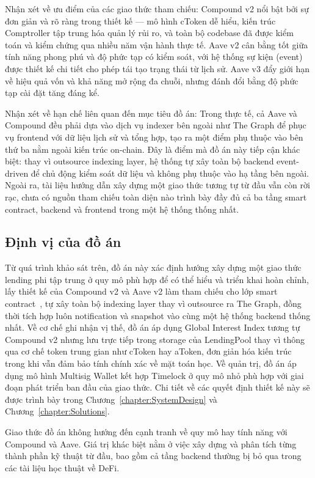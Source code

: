 \documentclass[../DoAn.tex]{subfiles}
\begin{document}
Nhận xét về ưu điểm của các giao thức tham chiếu: Compound v2 nổi bật bởi sự đơn giản và rõ ràng trong thiết kế --- mô hình cToken dễ hiểu, kiến trúc Comptroller tập trung hóa quản lý rủi ro, và toàn bộ codebase đã được kiểm toán và kiểm chứng qua nhiều năm vận hành thực tế. Aave v2 cân bằng tốt giữa tính năng phong phú và độ phức tạp có kiểm soát, với hệ thống sự kiện (event) được thiết kế chi tiết cho phép tái tạo trạng thái từ lịch sử. Aave v3 đẩy giới hạn về hiệu quả vốn và khả năng mở rộng đa chuỗi, nhưng đánh đổi bằng độ phức tạp cài đặt tăng đáng kể.

Nhận xét về hạn chế liên quan đến mục tiêu đồ án: Trong thực tế, cả Aave và Compound đều phải dựa vào dịch vụ indexer bên ngoài như The Graph để phục vụ frontend với dữ liệu lịch sử và tổng hợp, tạo ra một điểm phụ thuộc vào bên thứ ba nằm ngoài kiến trúc on-chain. Đây là điểm mà đồ án này tiếp cận khác biệt: thay vì outsource indexing layer, hệ thống tự xây toàn bộ backend event-driven để chủ động kiểm soát dữ liệu và không phụ thuộc vào hạ tầng bên ngoài. Ngoài ra, tài liệu hướng dẫn xây dựng một giao thức tương tự từ đầu vẫn còn rời rạc, chưa có nguồn tham chiếu toàn diện nào trình bày đầy đủ cả ba tầng smart contract, backend và frontend trong một hệ thống thống nhất.

\subsection{Định vị của đồ án}


Từ quá trình khảo sát trên, đồ án này xác định hướng xây dựng một giao thức lending phi tập trung ở quy mô phù hợp để có thể hiểu và triển khai hoàn chỉnh, lấy thiết kế của Compound v2 và Aave v2 làm tham chiếu cho lớp smart contract~\cite{CompoundV2Docs,AaveV2Whitepaper}, tự xây toàn bộ indexing layer thay vì outsource ra The Graph, đồng thời tích hợp luôn notification và snapshot vào cùng một hệ thống backend thống nhất. Về cơ chế ghi nhận vị thế, đồ án áp dụng Global Interest Index tương tự Compound v2 nhưng lưu trực tiếp trong storage của LendingPool thay vì thông qua cơ chế token trung gian như cToken hay aToken, đơn giản hóa kiến trúc trong khi vẫn đảm bảo tính chính xác về mặt toán học. Về quản trị, đồ án áp dụng mô hình Multisig Wallet kết hợp Timelock ở quy mô nhỏ phù hợp với giai đoạn phát triển ban đầu của giao thức. Chi tiết về các quyết định thiết kế này sẽ được trình bày trong Chương~\ref{chapter:SystemDesign} và Chương~\ref{chapter:Solutions}.

Giao thức đồ án không hướng đến cạnh tranh về quy mô hay tính năng với Compound và Aave. Giá trị khác biệt nằm ở việc xây dựng và phân tích từng thành phần kỹ thuật từ đầu, bao gồm cả tầng backend thường bị bỏ qua trong các tài liệu học thuật về DeFi.
\end{document}
